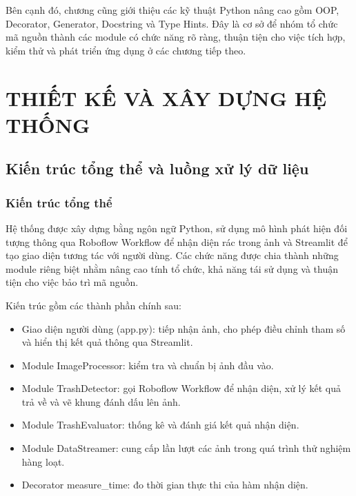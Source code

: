 \documentclass[a4paper,13pt]{extarticle}
\begin{document}
Bên cạnh đó, chương cũng giới thiệu các kỹ thuật Python nâng cao gồm OOP, Decorator, Generator, Docstring và Type Hints. Đây là cơ sở để nhóm tổ chức mã nguồn thành các module có chức năng rõ ràng, thuận tiện cho việc tích hợp, kiểm thử và phát triển ứng dụng ở các chương tiếp theo.



\section{ THIẾT KẾ VÀ XÂY DỰNG HỆ THỐNG}

\subsection{Kiến trúc tổng thể và luồng xử lý dữ liệu}

\subsubsection{Kiến trúc tổng thể}

Hệ thống được xây dựng bằng ngôn ngữ Python, sử dụng mô hình phát hiện đối tượng thông qua Roboflow Workflow để nhận diện rác trong ảnh và Streamlit để tạo giao diện tương tác với người dùng. Các chức năng được chia thành những module riêng biệt nhằm nâng cao tính tổ chức, khả năng tái sử dụng và thuận tiện cho việc bảo trì mã nguồn.

Kiến trúc gồm các thành phần chính sau:
\begin{itemize}
    \item[-] Giao diện người dùng (app.py): tiếp nhận ảnh, cho phép điều chỉnh tham số và hiển thị kết quả thông qua Streamlit.
    \item[-] Module ImageProcessor: kiểm tra và chuẩn bị ảnh đầu vào. 
    \item[-] Module TrashDetector: gọi Roboflow Workflow để nhận diện, xử lý kết quả trả về và vẽ khung đánh dấu lên ảnh. 
    \item[-] Module TrashEvaluator: thống kê và đánh giá kết quả nhận diện.
    \item[-] Module DataStreamer: cung cấp lần lượt các ảnh trong quá trình thử nghiệm hàng loạt.
    \item[-] Decorator measure\_time: đo thời gian thực thi của hàm nhận diện.
    
\end{itemize}
\end{document}
